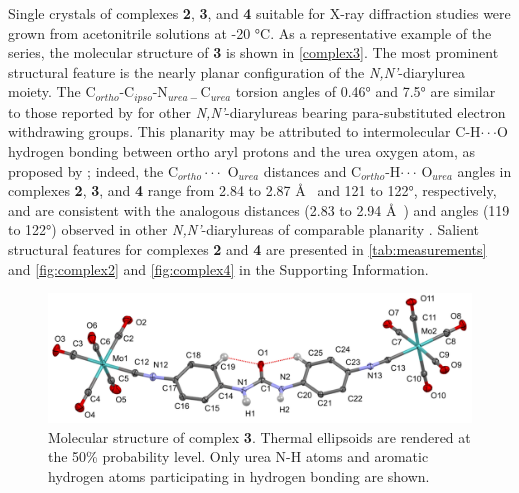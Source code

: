 Single crystals of complexes \textbf{2}, \textbf{3}, and \textbf{4} suitable for X-ray diffraction studies were grown from acetonitrile solutions at -20 °C. As a representative example of the series, the molecular structure of \textbf{3} is shown in \autoref{complex3}. The most prominent structural feature is the nearly planar configuration of the \textit{N,N'}-diarylurea moiety. The C$_{ortho}$-C$_{ipso}$-N$_{urea-}$C$_{urea}$ torsion angles of 0.46° and 7.5° are similar to those reported by \citet{Reddy2007} for other \textit{N,N'}-diarylureas bearing para-substituted electron withdrawing groups. This planarity may be attributed to intermolecular C-H$\cdot \cdot \cdot$O hydrogen bonding between ortho aryl protons and the urea oxygen atom, as proposed by \citet{Etter1990a}; indeed, the C$_{ortho}\cdot \cdot \cdot$ O$_{urea}$ distances and C$_{ortho}$-H$\cdot \cdot \cdot$ O$_{urea}$ angles in complexes \textbf{2}, \textbf{3}, and \textbf{4} range from 2.84 to 2.87 \AA~ and 121 to 122°, respectively, and are consistent with the analogous distances (2.83 to 2.94 \AA~) and angles (119 to 122°) observed in other \textit{N,N'}-diarylureas of comparable planarity \citep{Reddy2007, Etter1990a}. Salient structural features for complexes \textbf{2} and \textbf{4} are presented in \autoref{tab:measurements} and \autoref{fig:complex2} and \autoref{fig:complex4} in the Supporting Information. 

\begin{figure}[h!]
    \centering
    \includegraphics[width=0.8\linewidth]{figures/pub2/complex3.png}
    \caption{Molecular structure of complex \textbf{3}. Thermal ellipsoids are rendered at the 50\% probability level. Only urea N-H atoms and aromatic hydrogen atoms participating in hydrogen bonding are shown.}\label{complex3}
\end{figure}

